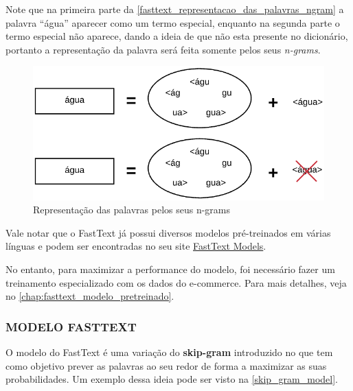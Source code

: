 Note que na primeira parte da \autoref{fasttext_representacao_das_palavras_ngram} a palavra “água” aparecer como um termo especial, enquanto na segunda parte o termo especial não aparece, dando a ideia de que não esta presente no dicionário, portanto a representação da palavra será feita somente pelos seus \textit{n-grams}.

\begin{figure}[]
	\caption{\label{fasttext_representacao_das_palavras_ngram} Representação das palavras pelos seus n-grams}
	\begin{center}
	    \includegraphics[scale=0.5]{artigo/recursos/imagens/fasttext_representacao_das_palavras_ngram.png}
	\end{center}
\end{figure}

Vale notar que o FastText já possui diversos modelos pré-treinados em várias línguas e podem ser encontradas no seu site \href{https://fasttext.cc/docs/en/english-vectors.html}{FastText Models}.

No entanto, para maximizar a performance do modelo, foi necessário fazer um treinamento especializado com os dados do e-commerce. Para mais detalhes, veja no \autoref{chap:fasttext_modelo_pretreinado}.

\subsubsection{MODELO FASTTEXT}

O modelo do FastText é uma variação do \textbf{skip-gram} introduzido no \cite{mikolov}que tem como objetivo prever as palavras ao seu redor de forma a maximizar as suas probabilidades. Um exemplo dessa ideia pode ser visto na \autoref{skip_gram_model}.

